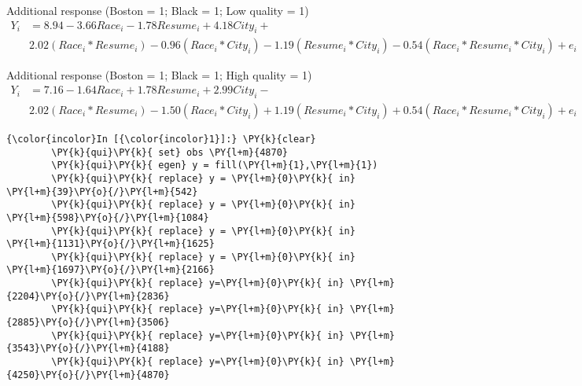 \documentclass[11pt,notitlepage]{article}\usepackage[]{graphicx}\usepackage[]{color}
\makeatletter
\newenvironment{kframe}{%
 \def\at@end@of@kframe{}%
 \ifinner\ifhmode%
  \def\at@end@of@kframe{\end{minipage}}%
  \begin{minipage}{\columnwidth}%
 \fi\fi%
 \def\FrameCommand##1{\hskip\@totalleftmargin \hskip-\fboxsep
 \colorbox{shadecolor}{##1}\hskip-\fboxsep
     \hskip-\linewidth \hskip-\@totalleftmargin \hskip\columnwidth}%
 \MakeFramed {\advance\hsize-\width
   \@totalleftmargin\z@ \linewidth\hsize
   \@setminipage}}%
 {\par\unskip\endMakeFramed%
 \at@end@of@kframe}
\newenvironment{knitrout}{}{} %
\makeatother
\begin{document}
\begin{enumerate}[a)]
Additional response (Boston = 1; Black = 1; Low quality = 1)
\begin{align*}
Y_i &= 8.94 - 3.66 Race_i - 1.78 Resume_i + 4.18 City_i + \\
& 2.02 (Race_i * Resume_i) - 0.96  (Race_i * City_i) - 1.19  (Resume_i * City_i) -0.54 (Race_i * Resume_i * City_i) + e_i
\end{align*}

Additional response (Boston = 1; Black = 1; High quality = 1)
\begin{align*}
Y_i &= 7.16 - 1.64 Race_i + 1.78 Resume_i + 2.99 City_i - \\
& 2.02 (Race_i * Resume_i) - 1.50  (Race_i * City_i) + 1.19  (Resume_i * City_i) + 0.54 (Race_i * Resume_i * City_i) + e_i
\end{align*}

\begin{knitrout}
\color{fgcolor}
\begin{kframe}
   \begin{Verbatim}[commandchars=\\\{\}]
{\color{incolor}In [{\color{incolor}1}]:} \PY{k}{clear}
        \PY{k}{qui}\PY{k}{ set} obs \PY{l+m}{4870}
        \PY{k}{qui}\PY{k}{ egen} y = fill(\PY{l+m}{1},\PY{l+m}{1})
        \PY{k}{qui}\PY{k}{ replace} y = \PY{l+m}{0}\PY{k}{ in} \PY{l+m}{39}\PY{o}{/}\PY{l+m}{542}
        \PY{k}{qui}\PY{k}{ replace} y = \PY{l+m}{0}\PY{k}{ in} \PY{l+m}{598}\PY{o}{/}\PY{l+m}{1084}
        \PY{k}{qui}\PY{k}{ replace} y = \PY{l+m}{0}\PY{k}{ in} \PY{l+m}{1131}\PY{o}{/}\PY{l+m}{1625}
        \PY{k}{qui}\PY{k}{ replace} y = \PY{l+m}{0}\PY{k}{ in} \PY{l+m}{1697}\PY{o}{/}\PY{l+m}{2166}
        \PY{k}{qui}\PY{k}{ replace} y=\PY{l+m}{0}\PY{k}{ in} \PY{l+m}{2204}\PY{o}{/}\PY{l+m}{2836}
        \PY{k}{qui}\PY{k}{ replace} y=\PY{l+m}{0}\PY{k}{ in} \PY{l+m}{2885}\PY{o}{/}\PY{l+m}{3506}
        \PY{k}{qui}\PY{k}{ replace} y=\PY{l+m}{0}\PY{k}{ in} \PY{l+m}{3543}\PY{o}{/}\PY{l+m}{4188}
        \PY{k}{qui}\PY{k}{ replace} y=\PY{l+m}{0}\PY{k}{ in} \PY{l+m}{4250}\PY{o}{/}\PY{l+m}{4870}
        

\end{Verbatim}
\end{kframe}
\end{knitrout}
\end{enumerate}
\end{document}
